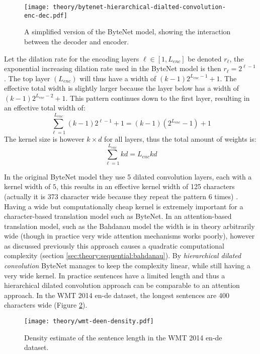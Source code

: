 \begin{figure}[h]
    \centering
    \texttt{[image: theory/bytenet-hierarchical-dialted-convolution-enc-dec.pdf]}
    \caption{A simplified version of the ByteNet model, showing the interaction between the decoder and encoder.}
    \label{fig:bytenet:simplified-hdc}
\end{figure}

Let the dilation rate for the encoding layers $\ell \in [1, L_{enc}]$ be denoted $r_\ell$, the exponential increasing dilation rate used in the ByteNet model is then $r_\ell = 2^{\ell - 1}$. The top layer $(L_{enc})$ will thus have a width of $(k-1) 2^{L_{enc} -1} + 1$. The effective total width is slightly larger because the layer below has a width of $(k-1) 2^{L_{enc} - 2} + 1$. This pattern continues down to the first layer, resulting in an effective total width of:
\begin{equation}
\sum_{\ell = 1}^{L_{enc}} (k - 1) 2^{\ell-1} + 1 = (k - 1) (2^{L_{enc}} - 1) + 1
\end{equation}
The kernel size is however $k \times d$ for all layers, thus the total amount of weights is:
\begin{equation}
\sum_{\ell = 1}^{L_{enc}} k d = L_{enc} k d
\end{equation}

In the original ByteNet model they use 5 dilated convolution layers, each with a kernel width of $5$, this results in an effective kernel width of 125 characters (actually it is 373 character wide because they repeat the pattern 6 times) . Having a wide but computationally cheap kernel is extremely important for a character-based translation model such as ByteNet. In an attention-based translation model, such as the Bahdanau model \cite{bahdanau-2015-nmt} the width is in theory arbitrarily wide (though in practice very wide attention mechanisms works poorly), however as discussed previously this approach causes a quadratic computational complexity (section \ref{sec:theory:sequential:bahdanau}). By \textit{hierarchical dilated convolution} ByteNet manages to keep the complexity linear, while still having a very wide kernel. In practice sentences have a limited length and thus a hierarchical dilated convolution approach can be comparable to an attention approach. In the WMT 2014 en-de dataset, the longest sentences are 400 characters wide (Figure \ref{fig:bytenet:wmt-deen-density}).

\begin{figure}[h]
    \centering
    \texttt{[image: theory/wmt-deen-density.pdf]}
    \caption{Density estimate of the sentence length in the WMT 2014 en-de dataset.}
    \label{fig:bytenet:wmt-deen-density}
\end{figure}

